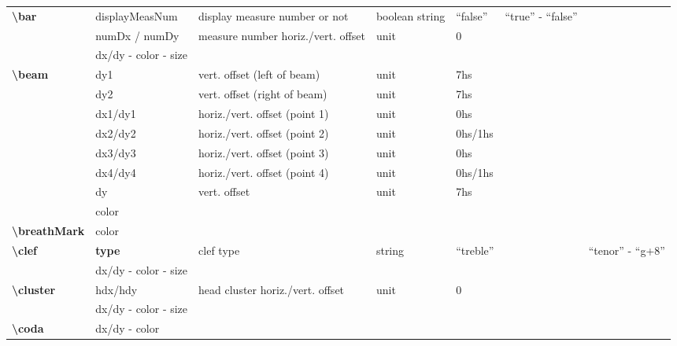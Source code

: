 \documentclass[a4paper, landscape, 10pt]{article}
\begin{document}
\begin{tabularx}{\linewidth}{p{3cm}p{3cm}p{6cm}p{2.5cm}p{2.5cm}p{3.5cm}p{3.5cm}}
    \hline
    \textbf{\textbackslash{}bar}&displayMeasNum&display measure number or not&boolean string&``false''&``true'' - ``false''&\\
    &numDx / numDy&measure number horiz./vert. offset&unit&0&&\\
    &dx/dy - color - size&&&&&\\
    \hline
    \textbf{\textbackslash{}beam}&dy1&vert. offset (left of beam)&unit&7hs&&\\
    &dy2&vert. offset (right of beam)&unit&7hs&&\\
    &dx1/dy1&horiz./vert. offset (point 1)&unit&0hs&&\\
    &dx2/dy2&horiz./vert. offset (point 2)&unit&0hs/1hs&&\\
    &dx3/dy3&horiz./vert. offset (point 3)&unit&0hs&&\\
    &dx4/dy4&horiz./vert. offset (point 4)&unit&0hs/1hs&&\\
    &dy&vert. offset&unit&7hs&&\\
    &color&&&&&\\
    \hline
    \textbf{\textbackslash{}breathMark}&color&&&&&\\
    \hline
    \textbf{\textbackslash{}clef}&\textbf{type}&clef type&string&``treble''&&``tenor'' - ``g+8''\\
    &dx/dy - color - size&&&&&\\
    \hline
    \textbf{\textbackslash{}cluster}&hdx/hdy&head cluster horiz./vert. offset&unit&0&&\\
    &dx/dy - color - size&&&&&\\
    \hline
    \textbf{\textbackslash{}coda}&dx/dy - color&&&&&\\
    \hline
\end{tabularx}
\end{document}
